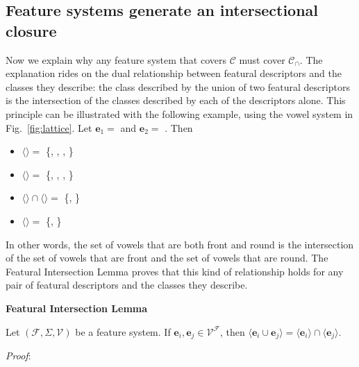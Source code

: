 \documentclass[11pt, oneside]{article}   	%
\begin{document}
\subsection{Feature systems generate an intersectional closure}

Now we explain why any feature system that covers $\mathcal C$ must cover $\mathcal C_\cap$. The explanation rides on the dual relationship between featural descriptors and the classes they describe: the class described by the union of two featural descriptors is the intersection of the classes described by each of the descriptors alone. This principle can be illustrated with the following example, using the vowel system in Fig.~\ref{fig:lattice}. Let $\mathbf{e}_1 =$  and $\mathbf{e}_2 =$ . Then \begin{itemize}
    \item $\langle$$\rangle =$ \{\textipa{\oe}, , , \}
    \item $\langle$$\rangle =$ \{\textipa{\oe}, , , \}
    \item $\langle$$\rangle \cap \langle$$\rangle =$ \{\textipa{\oe}, \}
    \item $\langle$$\rangle =$ \{\textipa{\oe}, \}
    \end{itemize}

In other words, the set of vowels that are both front and round is the intersection of the set of vowels that are front and the set of vowels that are round. The Featural Intersection Lemma proves that this kind of relationship holds for any pair of featural descriptors and the classes they describe.

\vspace{\baselineskip} \noindent \textbf{Featural Intersection Lemma}

Let $(\mathcal F, \Sigma, \mathcal V)$ be a feature system. If $\mathbf{e}_i, \mathbf{e}_j \in \mathcal V^\mathcal F$, then $\langle \mathbf{e}_i \cup \mathbf{e}_j \rangle =  \langle \mathbf{e}_i \rangle \cap \langle \mathbf{e}_j \rangle$.

\vspace{\baselineskip} \noindent \textit{Proof}:
\end{document}
